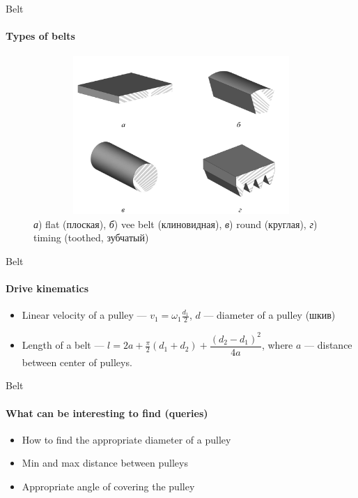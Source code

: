 \documentclass[aspectratio=169]{beamer}
\begin{document}
\begin{frame}[t]{Belt}
    \framesubtitle{Types of belts}
    \vspace{-1.2cm}
    \begin{figure}[H]
        \centering\includegraphics[height=6cm,width=1\textwidth,keepaspectratio]{belt_types.png}
        \caption*{\textit{а}) flat (плоская), \textit{б}) vee belt (клиновидная), \textit{в}) round (круглая), \textit{г}) timing (toothed, зубчатый)}
        \label{fig:belt_types.png}
    \end{figure}

\end{frame}

\begin{frame}[t]{Belt}
    \framesubtitle{Drive kinematics}
    \begin{itemize}
        \item Linear velocity of a pulley --- $v_1=\omega_1 \frac{d_1}{2}$, $d$ --- diameter of a pulley (шкив)
        \item Length of a belt --- $l = 2a + \frac{\pi}{2}(d_1 + d_2) + \dfrac{(d_2-d_1)^2}{4a}$, where $a$ --- distance between center of pulleys.
    \end{itemize}
\end{frame}


\begin{frame}[t]{Belt}
    \framesubtitle{What can be interesting to find (queries)}
    \begin{itemize}
        \item How to find the appropriate diameter of a pulley
        \item Min and max distance between pulleys
        \item Appropriate angle of covering the pulley
    \end{itemize}
\end{frame}
\end{document}
